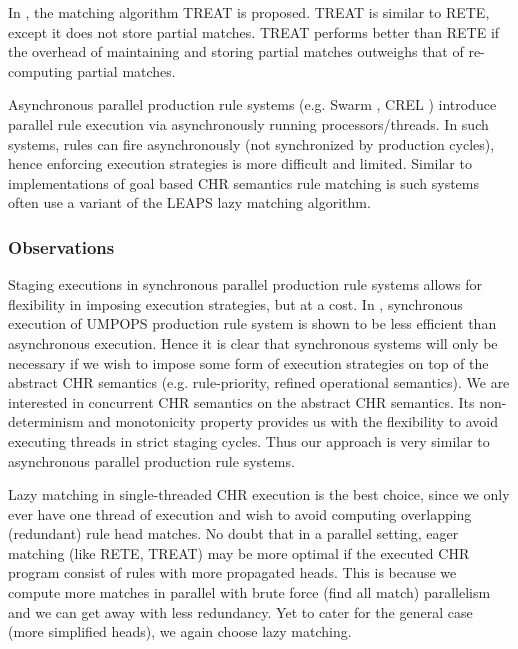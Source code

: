 \documentclass{tlp}
\begin{document}
In \cite{79070}, the matching algorithm TREAT is proposed. TREAT is similar to RETE,
except it does not store partial matches. TREAT performs better than RETE if the
overhead of maintaining and storing partial matches outweighs that of re-computing
partial matches.

Asynchronous parallel production rule systems (e.g. Swarm \cite{98939}, CREL \cite{898995}) 
introduce parallel rule execution via asynchronously running processors/threads. In such 
systems, rules can fire asynchronously (not synchronized by production cycles), hence 
enforcing execution strategies is more difficult and limited. Similar to implementations of 
goal based CHR semantics rule matching is such systems often use a variant of the 
LEAPS \cite{leaps90} lazy matching algorithm. 

\subsubsection{Observations}


Staging executions in synchronous parallel production rule systems allows for
flexibility in imposing execution strategies, but at a cost. In 
\cite{Neiman91controlissues}, synchronous execution of UMPOPS production rule 
system is shown to be less efficient than asynchronous execution. Hence it
is clear that synchronous systems will only be necessary if we wish to impose
some form of execution strategies on top of the abstract CHR semantics
(e.g. rule-priority, refined operational semantics). We are interested in
concurrent CHR semantics on the abstract CHR semantics.
Its non-determinism and monotonicity property provides us with the flexibility
to avoid executing threads in strict staging cycles. Thus our approach is
very similar to asynchronous parallel production rule systems. 

Lazy matching in single-threaded CHR execution is the best choice, since we
only ever have one thread of execution and wish to avoid computing overlapping 
(redundant) rule head matches. No doubt that in a parallel setting, eager matching
(like RETE, TREAT) may be more optimal if the executed CHR program consist of rules 
with more propagated heads. This is because we compute more matches in parallel with 
brute force (find all match) parallelism and we can get away with less redundancy. 
Yet to cater for the general case (more simplified heads), we again choose
lazy matching.
\end{document}
